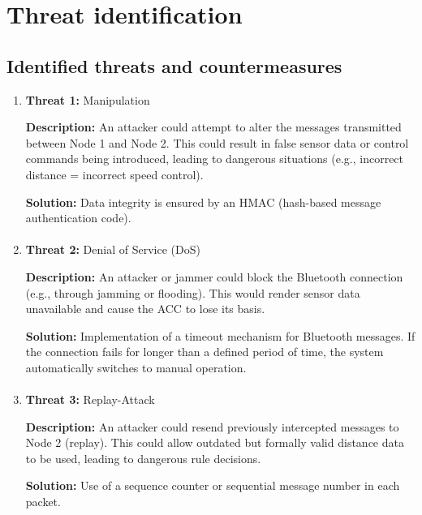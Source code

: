 \section{Threat identification}
\label{chapter5}

\subsection{Identified threats and countermeasures}


	\begin{enumerate}
		\item \textbf{Threat 1:} Manipulation
            
            \textbf{Description:} An attacker could attempt to alter the messages transmitted between Node 1 and Node 2. This could result in false sensor data or control commands being introduced, leading to dangerous situations (e.g., incorrect distance = incorrect speed control).
            
            \textbf{Solution:} Data integrity is ensured by an HMAC (hash-based message authentication code).
        
        \paragraph{} 
		\item \textbf{Threat 2:} Denial of Service (DoS)
            
            \textbf{Description:} An attacker or jammer could block the Bluetooth connection (e.g., through jamming or flooding). This would render sensor data unavailable and cause the ACC to lose its basis.
            
            \textbf{Solution:} Implementation of a timeout mechanism for Bluetooth messages. If the connection fails for longer than a defined period of time, the system automatically switches to manual operation.
        
        \paragraph{} 
		\item \textbf{Threat 3:} Replay-Attack
            
            \textbf{Description:} An attacker could resend previously intercepted messages to Node 2 (replay). This could allow outdated but formally valid distance data to be used, leading to dangerous rule decisions.
            
            \textbf{Solution:} Use of a sequence counter or sequential message number in each packet.
        
        \paragraph{} 
	\end{enumerate}
	
